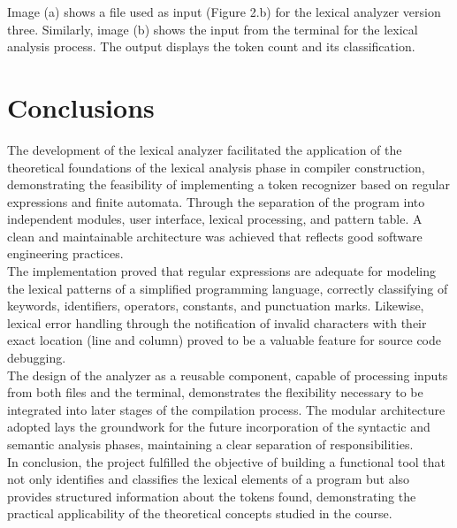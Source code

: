 \documentclass[letterpaper,12pt,oneside]{article}
\begin{document}
Image (a) shows a file used as input (Figure 2.b) for the lexical analyzer version three. Similarly, image (b) shows the input from the terminal for the lexical analysis process. The output displays the token count and its classification.

\section{Conclusions}
The development of the lexical analyzer facilitated the application of the theoretical foundations of the lexical analysis phase in compiler construction, demonstrating the feasibility of implementing a token recognizer based on regular expressions and finite automata. Through the separation of the program into independent modules, user interface, lexical processing, and pattern table. A clean and maintainable architecture was achieved that reflects good software engineering practices.\\

The implementation proved that regular expressions are adequate	for modeling the lexical patterns of a simplified programming language, correctly classifying of keywords, identifiers, operators, constants, and punctuation marks. Likewise, lexical error handling through the notification of invalid characters with their exact location (line and column) proved to be a valuable feature for source code debugging.\\

The design of the analyzer as a reusable component, capable of processing inputs from both files and the terminal, demonstrates the flexibility necessary to be integrated into later stages of the compilation process. The modular architecture adopted lays the groundwork for the future incorporation of the syntactic and semantic analysis phases, maintaining a clear separation of responsibilities.\\

In conclusion, the project fulfilled the objective of building a functional tool that not only identifies and classifies the lexical elements of a program but also provides structured information about the tokens found, demonstrating the practical applicability of the theoretical concepts studied in the course.
\end{document}
